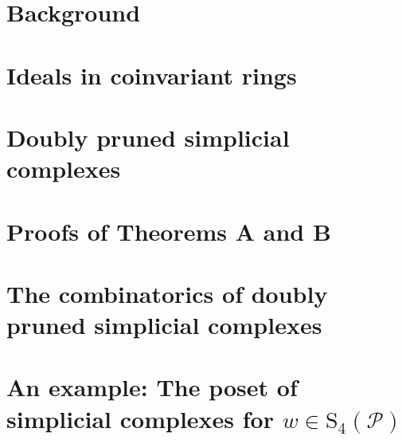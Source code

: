 \documentclass[11pt]{article}
\theoremstyle{definition}
\theoremstyle{plain}
\newcommand{\calP}{\mathcal{P}}
\begin{document}
\section{Background}
\label{sec: background}

\section{Ideals in coinvariant rings}
\label{sec: ideals in coinvariant rings}

\section{Doubly pruned simplicial complexes}
\label{sec: intro to doubly pruned simplicial complexes}

\section{Proofs of Theorems A and B}
\label{sec: proofs of the main theorems}

\section{The combinatorics of doubly pruned simplicial complexes}
\label{sec: the combinatorics of doubly pruned simplicial complexes}


\section{An example: The poset of simplicial complexes for \texorpdfstring{$w\in\mathrm{S}_4(\calP)$}{w avoiding P}}
\label{sec: example}


\newpage


\end{document}
